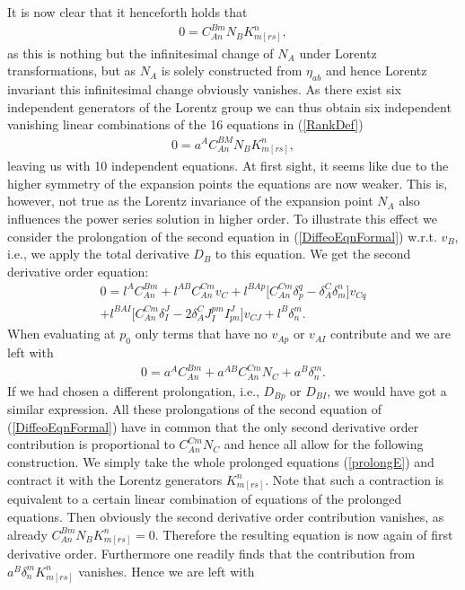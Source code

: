\documentclass[a4paper,12pt, DIV=14, BCOR=5mm, twoside, headsepline, numbers=noenddot]{scrbook}
\begin{document}
It is now clear that it henceforth holds that
\begin{align}
    0 = C^{Bm}_{An}N_B K_{m[rs]}^n,
\end{align}
as this is nothing but the infinitesimal change of $N_A$ under Lorentz transformations, but as $N_A$ is solely constructed from $\eta_{ab}$ and hence Lorentz invariant this infinitesimal change obviously vanishes. As there exist six independent generators of the Lorentz group we can thus obtain six independent vanishing linear combinations of the 16 equations in (\ref{RankDef})
\begin{align}
    0 = a^A C^{BM}_{An}N_B K_{m[rs]}^n,
\end{align}
leaving us with 10 independent equations. At first sight, it seems like due to the higher symmetry of the expansion points the equations are now weaker. This is, however, not true as the Lorentz invariance of the expansion point $N_A$ also influences the power series solution in higher order. To illustrate this effect we consider the prolongation of the second equation in (\ref{DiffeoEqnFormal}) w.r.t. $v_B$, i.e., we apply the total derivative $D_B$ to this equation. We get the second derivative order equation:
\begin{multline}
    0 = l^AC_{An}^{Bm} + l^{AB}C_{An}^{Cm}v_C + l^{BAp} \bigl[ C_{An}^{Cm} \delta_p^q - \delta_A^C \delta_m^n \bigr] v_{Cq}\\
    + l^{BAI} \bigl[ C_{An}^{Cm} \delta_I^J - 2 \delta_A^C J_I^{pm} I^J_{pn}  \bigr] v_{CJ} + l^{B} \delta^m_n.
\end{multline}
When evaluating at $p_0$ only terms that have no $v_{Ap}$ or $v_{AI}$ contribute and we are left with 
\begin{align}\label{prolongE}
    0 = a^A C_{An}^{Bm} + a^{AB} C_{An}^{Cm} N_C +  a^B \delta^m_n.
\end{align}
If we had chosen a different prolongation, i.e., $D_{Bp}$ or $D_{BI}$, we would have got a similar expression. All these prolongations of the second equation of (\ref{DiffeoEqnFormal}) have in common that the only second derivative order contribution is proportional to $C^{Cm}_{An} N_C$ and hence all allow for the following construction. We simply take the whole prolonged equations (\ref{prolongE}) and contract it with the Lorentz generators $K_{m[rs]}^n$. Note that such a contraction is equivalent to a certain linear combination of equations of the prolonged equations. Then obviously the second derivative order contribution vanishes, as already $C_{An}^{Bm} N_B K_{m[rs]}^n = 0$.  Therefore the resulting equation is now again of first derivative order. Furthermore one readily finds that the contribution from $a^B \delta^m_n K_{m[rs]}^n$ vanishes. Hence we are left with 
\end{document}
